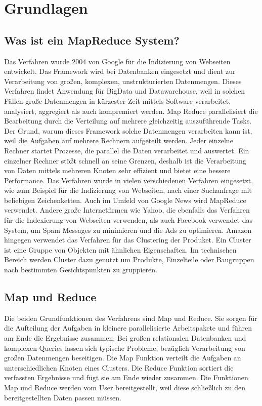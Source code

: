 \documentclass[a4paper,12pt]{article}
\begin{document}
\section{Grundlagen}

\subsection{Was ist ein MapReduce System?}
Das Verfahren wurde 2004 von Google für die Indizierung von Webseiten entwickelt. 
Das Framework wird bei Datenbanken eingesetzt und dient zur Verarbeitung von großen, komplexen, unstrukturierten Datenmengen.
Dieses Verfahren findet Anwendung für BigData und Datawarehouse, weil in solchen Fällen 
große Datenmengen in kürzester Zeit mittels Software verarbeitet, analysiert, aggregiert als auch kompremiert werden. 
Map Reduce parallelisiert die Bearbeitung durch die Verteilung auf mehrere gleichzeitig auszuführende Tasks. 
Der Grund, warum dieses Framework solche Datenmengen verarbeiten kann ist, weil die Aufgaben auf mehrere Rechnern aufgeteilt werden. 
Jeder einzelne Rechner startet Prozesse, die parallel die Daten verarbeitet und auswertet.
Ein einzelner Rechner stößt schnell an seine Grenzen, deshalb ist die Verarbeitung von Daten mittels mehreren Knoten sehr effizient und bietet eine bessere Performance.
Das Verfahren wurde in vielen verschiedenen Verfahren eingesetzt, wie zum Beispiel für die Indizierung von Webseiten, 
nach einer Suchanfrage mit beliebigen Zeichenketten. Auch im Umfeld von Google News wird MapReduce verwendet. 
Andere große Internetfirmen wie Yahoo, die ebenfalls das Verfahren für die Indexierung von Webseiten verwenden, 
als auch Facebook verwendet das System, um Spam Messages zu minimieren und die Ads zu optimieren. 
Amazon hingegen verwendet das Verfahren für das Clustering der Produket. 
Ein Cluster ist eine Gruppe von Objekten mit ähnlichen Eigenschaften.
Im technischen Bereich werden Cluster dazu genutzt um Produkte, Einzelteile oder Baugruppen nach bestimmten Gesichtspunkten zu gruppieren.

\subsection{Map und Reduce}
Die beiden Grundfunktionen des Verfahrens sind Map und Reduce. 
Sie sorgen für die Aufteilung der Aufgaben in kleinere parallelisierte Arbeitspakete und führen am Ende die Ergebnisse zusammen. 
Bei großen relationalen Datenbanken und komplexen Queries lassen sich typische Probleme, bezüglich Verarbeitung von großen Datenmengen beseitigen.
Die Map Funktion verteilt die Aufgaben an unterschiedlichen Knoten eines Clusters. 
Die Reduce Funktion sortiert die verfassten Ergebnisse und fügt sie am Ende wieder zusammen.
Die Funktionen Map und Reduce werden vom User bereitgestellt, weil diese schließlich zu den bereitgestellten Daten passen müssen.
\cite{mrsystem}
\newpage
\end{document}
